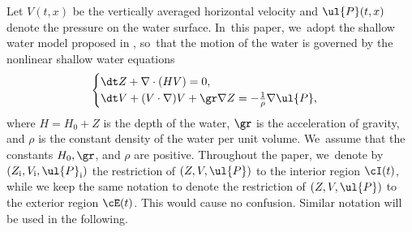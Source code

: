 Let $V(t,x)$ be the vertically averaged horizontal velocity and $\ul{P}(t,x)$ denote the pressure on the water surface. In~this paper, we~adopt the shallow water model proposed in \cite{Lannes2017}, so~that the motion of the water is governed by the nonlinear shallow water equations
\begin{equation}\label{NLSWE}
\begin{cases}
\dt Z+\nabla\cdot(HV) = 0, \\
\dt V+(V\cdot\nabla)V+\gr\nabla Z = -\frac{1}{\rho}\nabla\ul{P},
\end{cases}
\end{equation}
where $H=H_0+Z$ is the depth of the water, $\gr$ is the acceleration of gravity, and $\rho$ is the constant density of the water per unit volume. We~assume that the constants $H_0, \gr$, and $\rho$ are positive.
Throughout the paper, we~denote by $(Z_\mathrm{i},V_\mathrm{i},\ul{P}_\mathrm{i})$ the restriction of $(Z,V,\ul{P})$ to the interior region $\cI(t)$,
while we keep the same notation to denote the restriction of $(Z,V,\ul{P})$ to the exterior region $\cE(t)$.
This would cause no confusion.
Similar notation will be used in the following.

